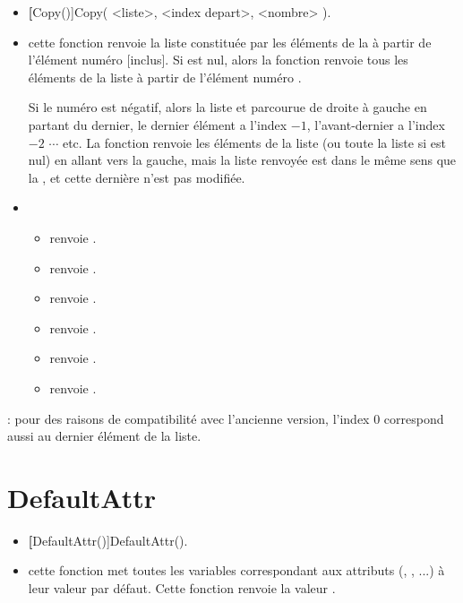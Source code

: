 \begin{itemize}
 \item \util \textbf[Copy()]{Copy( <liste>, <index depart>, <nombre> )}.
 \item \desc cette fonction renvoie la liste constituée par les  éléments de la  à partir de l'élément numéro  [inclus]. Si  est nul, alors la fonction renvoie tous les éléments de la liste à partir de l'élément numéro . 

 Si le numéro  est négatif, alors la liste et parcourue de droite à gauche en partant du dernier, le dernier élément a l'index $-1$, l'avant-dernier a l'index $-2$ $\cdots$ etc. La fonction renvoie les  éléments de la liste (ou toute la liste si  est nul) en allant vers la gauche, mais la liste renvoyée est dans le même sens que la , et cette dernière n'est pas modifiée. 
 \item \exem 
  \begin{itemize}
    \item {} renvoie \res{[2,3]}.
    \item {} renvoie \res{[2,3,4]}.
    \item {} renvoie \res{[2,3,4]}.
    \item {} renvoie \res{[3,4]}.
    \item {} renvoie \res{[2,3]}.
    \item {} renvoie \res{[1,2,3]}.
  \end{itemize}
\end{itemize} 

: pour des raisons de compatibilité avec l'ancienne version, l'index $0$ correspond aussi au dernier élément de la liste.

\section{DefaultAttr}\label{cmdDefaultAttr}

\begin{itemize}
 \item \util \textbf[DefaultAttr()]{DefaultAttr()}.
 \item \desc cette fonction met toutes les variables correspondant aux attributs (, , ...) à leur valeur par défaut. Cette fonction renvoie la valeur \Nil.
\end{itemize} 



